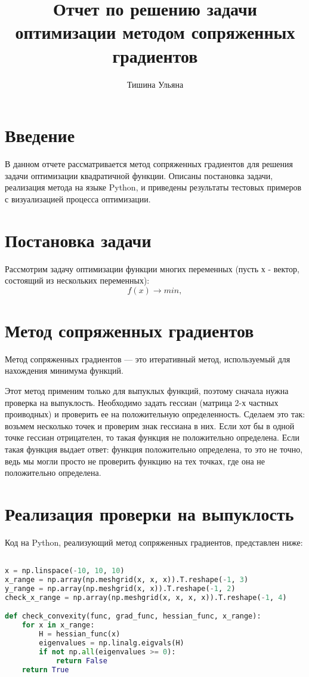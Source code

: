 \documentclass{article}
\title{Отчет по решению задачи оптимизации методом сопряженных градиентов}
\author{Тишина Ульяна}
\begin{document}
\maketitle

\newpage
\tableofcontents

\newpage
\section{Введение}
В данном отчете рассматривается метод сопряженных градиентов для решения задачи оптимизации квадратичной функции. Описаны постановка задачи, реализация метода на языке Python, и приведены результаты тестовых примеров с визуализацией процесса оптимизации.

\newpage
\section{Постановка задачи}
Рассмотрим задачу оптимизации функции многих переменных (пусть х - вектор, состоящий из нескольких переменных):
\begin{equation}
f(x)  \rightarrow min,
\end{equation}

\section{Метод сопряженных градиентов}
Метод сопряженных градиентов — это итеративный метод, используемый для нахождения минимума функций.

Этот метод применим только для выпуклых функций, поэтому сначала нужна проверка на выпуклость. Необходимо задать гессиан (матрица 2-х частных проиводных) и проверить ее на положительную определенность. Сделаем это так: возьмем несколько точек и проверим знак гессиана в них. Если хот бы в одной точке гессиан отрицателен, то такая функция не положительно определена. Если такая функция выдает ответ: функция положительно определена, то это не точно, ведь мы могли просто не проверить функцию на тех точках, где она не положительно определена.

\section{Реализация проверки на выпуклость}
Код на Python, реализующий метод сопряженных градиентов, представлен ниже:

\begin{lstlisting}[language=Python]

x = np.linspace(-10, 10, 10)
x_range = np.array(np.meshgrid(x, x, x)).T.reshape(-1, 3)
y_range = np.array(np.meshgrid(x, x)).T.reshape(-1, 2)
check_x_range = np.array(np.meshgrid(x, x, x, x)).T.reshape(-1, 4)

def check_convexity(func, grad_func, hessian_func, x_range):
    for x in x_range:
        H = hessian_func(x)
        eigenvalues = np.linalg.eigvals(H)
        if not np.all(eigenvalues >= 0):
            return False
    return True

\end{lstlisting}
\end{document}
